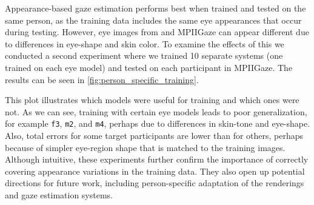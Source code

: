 Appearance-based gaze estimation performs best when trained and tested on the same person, as the training data includes the same eye appearances that occur during testing.
However, eye images from \dataset and MPIIGaze can appear different due to differences in eye-shape and skin color.
To examine the effects of this we conducted a second experiment where we trained 10 separate systems (one trained on each \dataset eye model) and tested on each participant in MPIIGaze.
The results can be seen in \autoref{fig:person_specific_training}.

This plot illustrates which \dataset models were useful for training and which ones were not.
As we can see, training with certain eye models leads to poor generalization, for example \texttt{f3}, \texttt{m2}, and \texttt{m4}, perhaps due to differences in skin-tone and eye-shape.
Also, total errors for some target participants are lower than for others, perhaps because of simpler eye-region shape that is matched to the training images.
Although intuitive, these experiments further confirm the importance of correctly covering appearance variations in the training data.
They also open up potential directions for future work, including person-specific adaptation of the renderings and gaze estimation systems.




